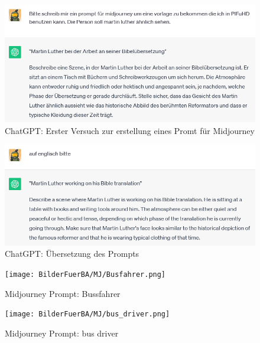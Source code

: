 \documentclass[10pt,a4paper,bibliography=totocnumbered,listof=totocnumbered]{scrartcl}
\begin{document}
\begin{figure}
	\centering
	\includegraphics[width=14cm]{BilderFuerBA/CGPTMidJourneyMartinLuther/02.png}
	\caption{ChatGPT: Erster Versuch zur erstellung eines Promt für Midjourney}
	\label{ChatGPT_erster_Versuch_Midjourney_Promt}
\end{figure}

\begin{figure}
	\centering
	\includegraphics[width=14cm]{BilderFuerBA/CGPTMidJourneyMartinLuther/03.png}
	\caption{ChatGPT: Übersetzung des Prompts}
	\label{ChatGPT_übersetzen}
\end{figure}

\begin{figure}
	\centering
	\begin{minipage}[t]{0.45\linewidth}
		\centering
		\texttt{[image: BilderFuerBA/MJ/Busfahrer.png]}
		\caption{Midjourney Prompt: Bussfahrer}
		\label{Bussfahrer}
	\end{minipage}
	\hfill
	\begin{minipage}[t]{0.45\linewidth}
		\centering
		\texttt{[image: BilderFuerBA/MJ/bus\_driver.png]}
		\caption{Midjourney Prompt: bus driver}
		\label{bus_driver}
	\end{minipage}
\end{figure}
\end{document}
